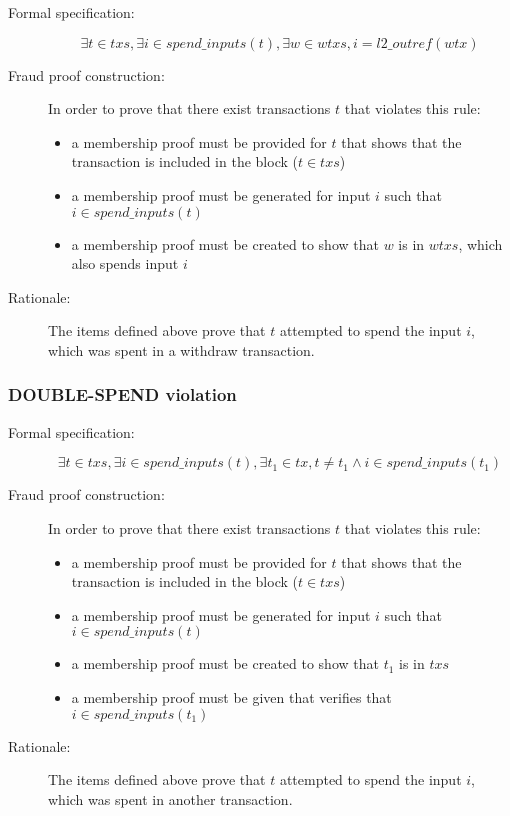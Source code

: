 \documentclass[../midgard.tex]{subfiles}
\begin{document}
\begin{description}

\item[Formal specification:]
\begin{equation*}
    \exists t \in txs, \exists i \in spend\_inputs(t), \exists w \in wtxs, i = l2\_outref(wtx)
\end{equation*}

\item[Fraud proof construction:] In order to prove that there exist transactions $t$ that violates this rule:
\begin{itemize}
    \item a membership proof must be provided for $t$ that shows that the transaction is included in the block ($t \in txs$)
    \item a membership proof must be generated for input $i$ such that $i \in spend\_inputs(t)$
    \item a membership proof must be created to show that $w$ is in $wtxs$, which also spends input $i$
\end{itemize}

\item[Rationale:] The items defined above prove that $t$ attempted to spend the input $i$, which was spent in a withdraw transaction.

\end{description}

\subsubsection{DOUBLE-SPEND violation}
\label{violation:DOUBLE-SPEND}

\begin{description}

\item[Formal specification:]
\begin{equation*}
    \exists t \in txs, \exists i \in spend\_inputs(t), \exists t_1 \in tx, t \neq t_1 \land i \in spend\_inputs(t_1)
\end{equation*}

\item[Fraud proof construction:] In order to prove that there exist transactions $t$ that violates this rule:
\begin{itemize}
    \item a membership proof must be provided for $t$ that shows that the transaction is included in the block ($t \in txs$)
    \item a membership proof must be generated for input $i$ such that $i \in spend\_inputs(t)$
    \item a membership proof must be created to show that $t_1$ is in $txs$
    \item a membership proof must be given that verifies that $i \in spend\_inputs(t_1)$
\end{itemize}

\item[Rationale:] The items defined above prove that $t$ attempted to spend the input $i$, which was spent in another transaction.

\end{description}
\end{document}
